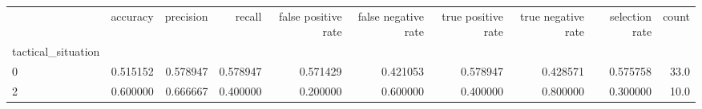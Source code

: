 \begin{tabular}{lrrrrrrrrr}
\toprule
{} &  accuracy &  precision &    recall &  false positive rate &  false negative rate &  true positive rate &  true negative rate &  selection rate &  count \\
tactical\_situation &           &            &           &                      &                      &                     &                     &                 &        \\
\midrule
0                  &  0.515152 &   0.578947 &  0.578947 &             0.571429 &             0.421053 &            0.578947 &            0.428571 &        0.575758 &   33.0 \\
2                  &  0.600000 &   0.666667 &  0.400000 &             0.200000 &             0.600000 &            0.400000 &            0.800000 &        0.300000 &   10.0 \\
\bottomrule
\end{tabular}
